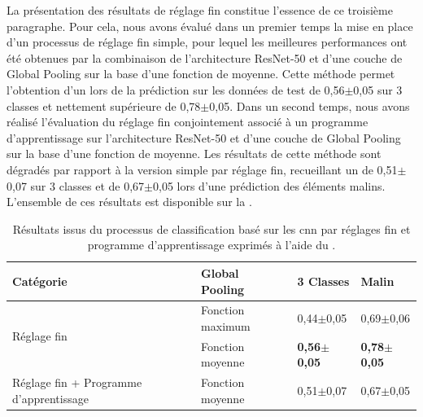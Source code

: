 La présentation des résultats de réglage fin constitue l'essence de ce troisième paragraphe. Pour cela, nous avons évalué dans un premier temps la mise en place d'un processus de réglage fin simple, pour lequel les meilleures performances ont été obtenues par la combinaison de l'architecture ResNet-50 et d'une couche de Global Pooling sur la base d'une fonction de moyenne. Cette méthode permet l'obtention d'un \fscore{} lors de la prédiction sur les données de test de 0,56$\pm$0,05 sur 3 classes et nettement supérieure de 0,78$\pm$0,05. Dans un second temps, nous avons réalisé l'évaluation du réglage fin conjointement associé à un programme d'apprentissage sur l'architecture ResNet-50 et d'une couche de Global Pooling sur la base d'une fonction de moyenne. Les résultats de cette méthode sont dégradés par rapport à la version simple par réglage fin, recueillant un \fscore{} de 0,51$\pm$0,07 sur 3 classes et de 0,67$\pm$0,05 lors d'une prédiction des éléments malins. L'ensemble de ces résultats est disponible sur la .\par

\begin{table}[H]
    \centering
    \begin{tabular}{llll}
        \toprule
        Catégorie                               & Global Pooling    & 3 Classes         & Malin             \\ \midrule
        \multirow{2}{*}{Réglage fin}            & Fonction maximum  & 0,44$\pm$0,05         & 0,69$\pm$0,06         \\ \cline{2-4}
                                                & Fonction moyenne  & \textbf{0,56$\pm$0,05}& \textbf{0,78$\pm$0,05}\\ \midrule
        Réglage fin + Programme d'apprentissage & Fonction moyenne  & 0,51$\pm$0,07         & 0,67$\pm$0,05         \\
        \bottomrule
    \end{tabular}
    
    \caption{Résultats issus du processus de classification basé sur les \gls{cnn} par réglages fin et programme d'apprentissage exprimés à l'aide du \fscore.}
    \label{tab:parameters_image_improvement_fine}
\end{table}


